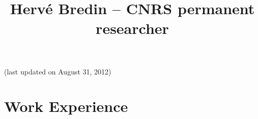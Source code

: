 \documentclass{simplecv}
\begin{document}
\pagestyle{empty} 



\title{Herv\'{e} Bredin -- CNRS permanent researcher}

\maketitle

\vspace{-1cm}
\begin{center}
(last updated on August 31, 2012)
\end{center}

\section{Work Experience}
\end{document}
